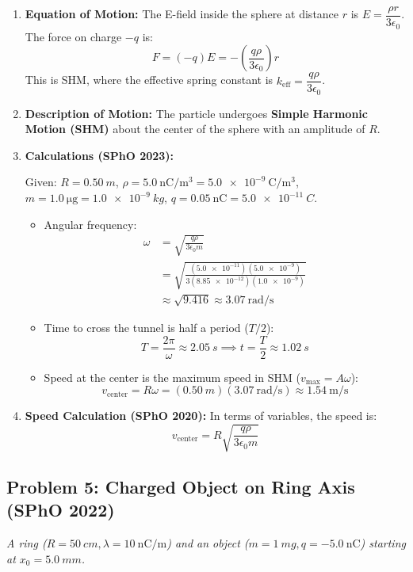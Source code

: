 \documentclass{article}
\numberwithin{equation}{section}
\begin{document}
\begin{enumerate}
    \item \textbf{Equation of Motion:} The E-field inside the sphere at distance $r$ is $E = \dfrac{\rho r}{3\epsilon_0}$. The force on charge $-q$ is:
    $$ F = (-q)E = -\left(\frac{q\rho}{3\epsilon_0}\right)r $$
    This is SHM, where the effective spring constant is $k_{\text{eff}} = \dfrac{q\rho}{3\epsilon_0}$.
    
    \item \textbf{Description of Motion:} The particle undergoes \textbf{Simple Harmonic Motion (SHM)} about the center of the sphere with an amplitude of $R$.
    
    \item \textbf{Calculations (SPhO 2023):}
    
    Given: $R=\SI{0.50}{m}$, $\rho = \SI{5.0}{\nano\coulomb\per\meter\cubed} = \SI{5.0e-9}{\coulomb\per\meter\cubed}$, $m=\SI{1.0}{\micro\gram} = \SI{1.0e-9}{kg}$, $q = \SI{0.05}{\nano\coulomb} = \SI{5.0e-11}{C}$.
    \begin{itemize}
        \item Angular frequency:
        \begin{align*}
            \omega &= \sqrt{\frac{q\rho}{3\epsilon_0 m}} \\
            &= \sqrt{\frac{(\num{5.0e-11})(\num{5.0e-9})}{3(\num{8.85e-12})(\num{1.0e-9})}} \\
            &\approx \sqrt{9.416} \approx \SI{3.07}{\radian\per\second}
        \end{align*}
        \item Time to cross the tunnel is half a period ($T/2$):
        $$ T = \frac{2\pi}{\omega} \approx \SI{2.05}{s} \implies t = \frac{T}{2} \approx \SI{1.02}{s} $$
        \item Speed at the center is the maximum speed in SHM ($v_{\text{max}} = A\omega$):
        $$ v_{\text{center}} = R\omega = (\SI{0.50}{m})(\SI{3.07}{\radian\per\second}) \approx \SI{1.54}{\meter\per\second} $$
    \end{itemize}
    \item \textbf{Speed Calculation (SPhO 2020):} In terms of variables, the speed is:
    $$ v_{\text{center}} = R\sqrt{\frac{q\rho}{3\epsilon_0 m}} $$
\end{enumerate}

\hrulefill
\subsection{Problem 5: Charged Object on Ring Axis (SPhO 2022)}
\textit{A ring ($R=\SI{50}{cm}, \lambda = \SI{+10}{\nano\coulomb\per\meter}$) and an object ($m=\SI{1}{mg}, q=\SI{-5.0}{\nano\coulomb}$) starting at $x_0 = \SI{5.0}{mm}$.}
\end{document}
